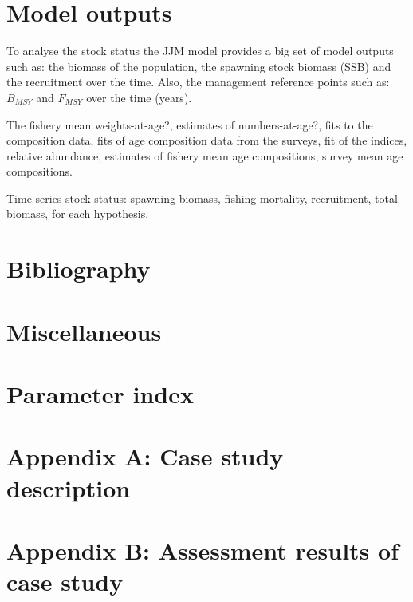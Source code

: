 \documentclass{article}
\begin{document}
\section{Model outputs}

To analyse the stock status the JJM model provides a big set of model outputs such as: the biomass of the population, the spawning stock biomass (SSB) and the recruitment over the time. Also, the management reference points such as: \(B_{MSY}\) and \(F_{MSY}\) over the time (years).

The fishery mean weights-at-age?, estimates of numbers-at-age?, fits to the composition data, fits of age composition data from the surveys, fit of the indices, relative abundance, estimates of fishery mean age compositions, survey mean age compositions.

Time series stock status: spawning biomass, fishing mortality, recruitment, total biomass, for each hypothesis.


\section{Bibliography}

\section{Miscellaneous}
\section{Parameter index}

\section{Appendix A: Case study description}
\label{section:AppendixA}

\section{Appendix B: Assessment results of case study}
\label{section:AppendixB}
\end{document}
